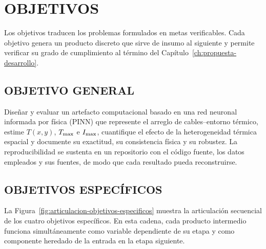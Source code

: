 \section{OBJETIVOS}
\label{sec:objetivos}

Los objetivos traducen los problemas formulados en metas verificables. Cada objetivo genera un producto discreto que sirve de insumo al siguiente y permite verificar su grado de cumplimiento al término del Capítulo~\ref{ch:propuesta-desarrollo}.

\subsection{OBJETIVO GENERAL}

Diseñar y evaluar un artefacto computacional basado en una red neuronal informada por física (PINN) que represente el arreglo de cables--entorno térmico, estime $T(x,y)$, $T_{\max}$ e $I_{\max}$, cuantifique el efecto de la heterogeneidad térmica espacial y documente su exactitud, su consistencia física y su robustez. La reproducibilidad se sustenta en un repositorio con el código fuente, los datos empleados y sus fuentes, de modo que cada resultado pueda reconstruirse.

\subsection{OBJETIVOS ESPECÍFICOS}

La Figura~\ref{fig:articulacion-objetivos-especificos} muestra la articulación secuencial de los cuatro objetivos específicos. En esta cadena, cada producto intermedio funciona simultáneamente como variable dependiente de su etapa y como componente heredado de la entrada en la etapa siguiente.

